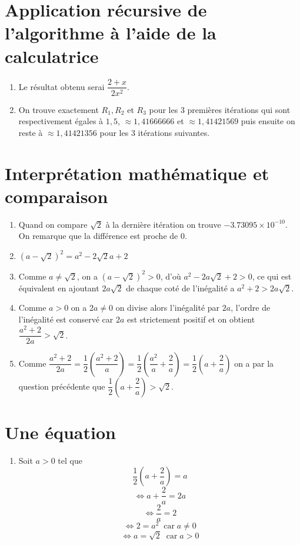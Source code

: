 \documentclass[french]{article}
\begin{document}
\section*{Application récursive de l'algorithme à l'aide de la calculatrice}

\begin{enumerate}
\item Le résultat obtenu serai $\dfrac{2+x}{2x^2}$.
\item On trouve exactement $R_1,R_2$ et $R_3$ pour les 3 premières itérations qui sont respectivement égales à $1,5$, $\approx 1,41666666$ et $ \approx 1,41421569$ puis ensuite on reste à $\approx 1,41421356$ pour les 3 itérations suivantes.
\end{enumerate}

\section*{Interprétation mathématique et comparaison}
\begin{enumerate}

\item Quand on compare $\sqrt2$ à la dernière itération on trouve $-3.73095 \times 10^{-10}$. On remarque que la différence est proche de 0.  
\item $(a-\sqrt2)^2=a^2-2\sqrt2 a+ 2$
\item Comme $a\neq \sqrt2$, on a $(a-\sqrt2)^2 > 0$, d'où $a^2 -2a\sqrt2 +2 > 0$, ce qui est équivalent en ajoutant $2a\sqrt2$ de chaque coté de l'inégalité a $a^2 +2 > 2a\sqrt2$.
\item Comme $a>0$ on a $2a\neq0$ on divise alors l'inégalité par $2a$, l'ordre de l'inégalité est conservé car $2a$ est strictement positif et on obtient $\dfrac{a^2 +2}{2a}>\sqrt2$.
\item Comme $\dfrac{a^2+2}{2a}=\dfrac{1}{2}(\dfrac{a^2+2}{a})=\dfrac{1}{2}(\dfrac{a^2}{a}+\dfrac{2}{a})= \dfrac{1}{2}(a+\dfrac{2}{a})$ on a par la question précédente que $\dfrac{1}{2}(a+\dfrac{2}{a}) >\sqrt2$.
\end{enumerate}

\newpage

\section*{Une équation}
\begin{enumerate}
\item Soit $a>0$ tel que $$ \dfrac{1}{2}(a+\dfrac{2}{a})=a$$
$$\Longleftrightarrow a+\dfrac{2}{a}=2a $$
$$\Longleftrightarrow \dfrac{2}{a}=2 $$
$$\Longleftrightarrow 2=a^2  \; \; \textrm{car} \; a \neq 0$$
$$\Longleftrightarrow a=\sqrt2 \; \; \textrm{car} \; a>0$$

\end{enumerate}
\end{document}
